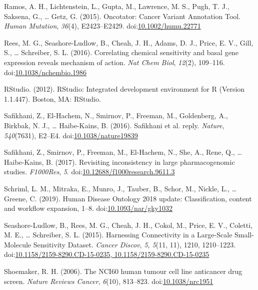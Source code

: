 \documentclass[man]{apa6}
\begin{document}
\hypertarget{ref-ramos2015a}{}
Ramos, A. H., Lichtenstein, L., Gupta, M., Lawrence, M. S., Pugh, T. J.,
Saksena, G., \ldots{} Getz, G. (2015). Oncotator: Cancer Variant
Annotation Tool. \emph{Human Mutation}, \emph{36}(4), E2423--E2429.
doi:\href{https://doi.org/10.1002/humu.22771}{10.1002/humu.22771}

\hypertarget{ref-rees2016}{}
Rees, M. G., Seashore-Ludlow, B., Cheah, J. H., Adams, D. J., Price, E.
V., Gill, S., \ldots{} Schreiber, S. L. (2016). Correlating chemical
sensitivity and basal gene expression reveals mechanism of action.
\emph{Nat Chem Biol}, \emph{12}(2), 109--116.
doi:\href{https://doi.org/10.1038/nchembio.1986}{10.1038/nchembio.1986}

\hypertarget{ref-rstudio2012}{}
RStudio. (2012). RStudio: Integrated development environment for R
(Version 1.1.447). Boston, MA: RStudio.

\hypertarget{ref-safikhani2016}{}
Safikhani, Z., El-Hachem, N., Smirnov, P., Freeman, M., Goldenberg, A.,
Birkbak, N. J., \ldots{} Haibe-Kains, B. (2016). Safikhani et al. reply.
\emph{Nature}, \emph{540}(7631), E2--E4.
doi:\href{https://doi.org/10.1038/nature19839}{10.1038/nature19839}

\hypertarget{ref-safikhani2017}{}
Safikhani, Z., Smirnov, P., Freeman, M., El-Hachem, N., She, A., Rene,
Q., \ldots{} Haibe-Kains, B. (2017). Revisiting inconsistency in large
pharmacogenomic studies. \emph{F1000Res}, \emph{5}.
doi:\href{https://doi.org/10.12688/f1000research.9611.3}{10.12688/f1000research.9611.3}

\hypertarget{ref-schriml2019}{}
Schriml, L. M., Mitraka, E., Munro, J., Tauber, B., Schor, M., Nickle,
L., \ldots{} Greene, C. (2019). Human Disease Ontology 2018 update:
Classification, content and workflow expansion, 1--8.
doi:\href{https://doi.org/10.1093/nar/gky1032}{10.1093/nar/gky1032}

\hypertarget{ref-seashore-ludlow2015}{}
Seashore-Ludlow, B., Rees, M. G., Cheah, J. H., Cokol, M., Price, E. V.,
Coletti, M. E., \ldots{} Schreiber, S. L. (2015). Harnessing
Connectivity in a Large-Scale Small-Molecule Sensitivity Dataset.
\emph{Cancer Discov}, \emph{5, 5}(11, 11), 1210, 1210--1223.
doi:\href{https://doi.org/10.1158/2159-8290.CD-15-0235,\%2010.1158/2159-8290.CD-15-0235}{10.1158/2159-8290.CD-15-0235, 10.1158/2159-8290.CD-15-0235}

\hypertarget{ref-shoemaker2006}{}
Shoemaker, R. H. (2006). The NCI60 human tumour cell line anticancer
drug screen. \emph{Nature Reviews Cancer}, \emph{6}(10), 813--823.
doi:\href{https://doi.org/10.1038/nrc1951}{10.1038/nrc1951}
\end{document}
